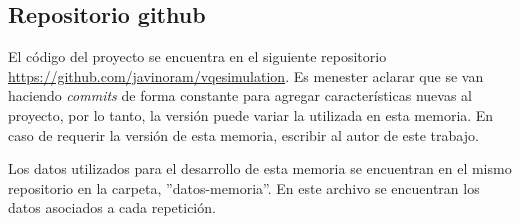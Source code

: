 

\subsection*{Repositorio github}
El código del proyecto se encuentra en el siguiente repositorio \url{https://github.com/javinoram/vqesimulation}. Es menester aclarar que se van haciendo \textit{commits} de forma constante para agregar características nuevas al proyecto, por lo tanto, la versión puede variar la utilizada en esta memoria. En caso de requerir la versión de esta memoria, escribir al autor de este trabajo.

Los datos utilizados para el desarrollo de esta memoria se encuentran en el mismo repositorio en la carpeta, ''datos-memoria''. En este archivo se encuentran los datos asociados a cada repetición.
